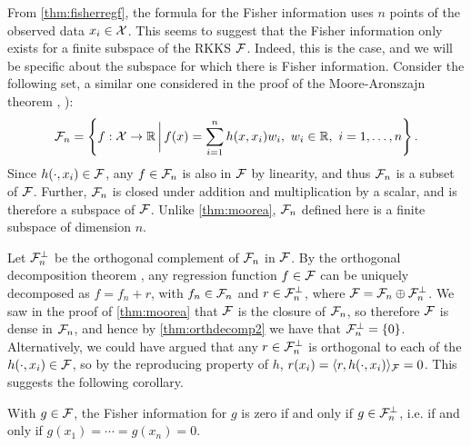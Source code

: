 From \cref{thm:fisherregf}, the formula for the Fisher information uses $n$ points of the observed data $x_i\in{\mathcal X}$.
This seems to suggest that the Fisher information only exists for a finite subspace of the RKKS ${\mathcal F}$.
Indeed, this is the case, and we will be specific about the subspace for which there is Fisher information.
Consider the following set, a similar one considered in the proof of the Moore-Aronszajn theorem , ):
\begin{align}\label{eq:subspaceFn}
{\mathcal F}_n = \left\{ f:{\mathcal X} \to \mathbb{R} \, \bigg| \, f(x) = \sum_{i=1}^n h(x,x_i)w_i, \ w_i \in \mathbb{R}, \ i=1,\dots,n \right\}.  
\end{align}
Since $h(\cdot,x_i) \in {\mathcal F}$, any $f \in {\mathcal F}_n$ is also in ${\mathcal F}$ by linearity, and thus ${\mathcal F}_n$ is a subset of ${\mathcal F}$.
Further, ${\mathcal F}_n$ is closed under addition and multiplication by a scalar, and is therefore a subspace of ${\mathcal F}$.
Unlike \cref{thm:moorea}, ${\mathcal F}_n$ defined here is a finite subspace of dimension $n$.

Let ${\mathcal F}_n^\bot$ be the orthogonal complement of ${\mathcal F}_n$ in ${\mathcal F}$.
By the orthogonal decomposition theorem , any regression function $f\in{\mathcal F}$ can be uniquely decomposed as $f = f_n + r$, with $f_n \in {\mathcal F}_n$ and $r \in {\mathcal F}_n^\bot$, where $\mathcal F = \mathcal F_n \oplus  {\mathcal F}_n^\bot$.
We saw in the proof of \cref{thm:moorea} that ${\mathcal F}$ is the closure of ${\mathcal F}_n$, so therefore ${\mathcal F}$ is dense in ${\mathcal F}_n$, and hence by \cref{thm:orthdecomp2}  we have that ${\mathcal F}_n^\bot = \{0\}$.
Alternatively, we could have argued that any $r \in {\mathcal F}_n^\bot$ is orthogonal to each of the $h(\cdot,x_i)\in{\mathcal F}$, so by the reproducing property of $h$, $r(x_i) = \langle r,h(\cdot,x_i)\rangle_{\mathcal F} = 0$.
This suggests the following corollary.

\begin{corollary}
  With $g \in {\mathcal F}$, the Fisher information for $g$ is zero if and only if $g\in{\mathcal F}_n^\bot$, i.e. if and only if $g(x_1) = \cdots = g(x_n) = 0$.
\end{corollary}

